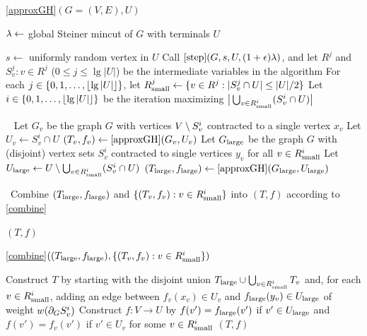 \begin{algorithm}[H]
\caption{\ref{approxGH}$(G=(V,E),U)$} 
\begin{algorithmic}[1]
\State $\lambda\gets $ global Steiner mincut of $G$ with terminals $U$ %

\State $s\gets$ uniformly random vertex in $U$
\State Call $\ref{step}(G,s,U,(1+\epsilon)\lambda)$, and let $R^j$ and $S^j_v:v\in R^j$ ($0\le j\le\lg|U|$) be the intermediate variables in the algorithm
\State For each $j\in\{0,1,\ldots,\lfloor\lg|U|\rfloor\}$, let $R^j_{\textup{small}}\gets \{ v\in R^j : |S^j_v\cap U|\le|U|/2 \}$  
\State Let $i\in\{0,1,\ldots,\lfloor\lg|U|\rfloor\}$ be the iteration maximizing $\big|\bigcup_{v\in R^i_{\textup{small}}} (S^i_v\cap U)\big|$ 

\ 
 
 \State Let $G_v$ be the graph $G$ with vertices $V\setminus S^i_v$ contracted to a single vertex $x_v$ 
 \State Let $U_v\gets S^i_v\cap U$
 \State $(T_v,f_v)\gets\ref{approxGH}(G_v,U_v)$
\EndFor
\State Let $G_{\textup{large}}$ be the graph $G$ with (disjoint) vertex sets $S^i_v$ contracted to single vertices $y_v$ for all $v\in R^i_{\textup{small}}$
\State Let $U_{\textup{large}}\gets U\setminus\bigcup_{v\in R^i_{\textup{small}}}(S^i_v\cap U)$
\State $(T_{\textup{large}},f_{\textup{large}})\gets\ref{approxGH}(G_{\textup{large}},U_{\textup{large}})$

\
\State Combine $(T_{\textup{large}},f_{\textup{large}})$ and $\{(T_v,f_v):v\in R^i_{\textup{small}}\}$ into $(T,f)$ according to \ref{combine}%

\State\Return $(T,f)$

\end{algorithmic}
\end{algorithm}


\begin{algorithm}[H]
\caption{\ref{combine}$((T_{\textup{large}},f_{\textup{large}}),\{(T_v,f_v): v\in R^i_{\textup{small}}\} )$} 
\begin{algorithmic}[1]
\State Construct $T$ by starting with the disjoint union $T_{\textup{large}}\cup\bigcup_{v\in R^i_{\textup{small}}}T_v$ and, for each $v\in R^i_{\textup{small}}$, adding an edge between $f_v(x_v)\in U_v$ and $f_{\textup{large}}(y_v)\in U_{\textup{large}}$ of weight $w(\partial_GS^i_v)$
\State Construct $f:V\to U$ by $f(v')=f_{\textup{large}}(v')$ if $v'\in U_{\textup{large}}$ and $f(v')=f_v(v')$ if $v'\in U_v$ for some $v\in R^i_{\textup{small}}$\linel{combine-f}
\State\Return $(T,f)$
\end{algorithmic}
\end{algorithm}

